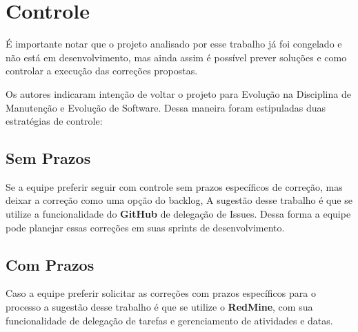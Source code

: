 \chapter{Controle}

É importante notar que o projeto analisado por esse trabalho já foi congelado 
e não está em desenvolvimento, mas ainda assim é possível prever soluções e 
como controlar a execução das correções propostas.

Os autores indicaram intenção de voltar o projeto para Evolução na Disciplina de 
Manutenção e Evolução de Software. Dessa maneira foram estipuladas duas estratégias 
de controle:

\section{Sem Prazos}

Se a equipe preferir seguir com controle sem prazos específicos de correção,
mas deixar a correção como uma opção do backlog, A sugestão desse trabalho é
que se utilize a funcionalidade do \textbf{GitHub} de delegação de Issues. Dessa forma
a equipe pode planejar essas correções em suas sprints de desenvolvimento.


\section{Com Prazos}

Caso a equipe preferir solicitar as correções com prazos específicos para o processo
a sugestão desse trabalho é que se utilize o \textbf{RedMine}, com sua funcionalidade
de delegação de tarefas e gerenciamento de atividades e datas.
